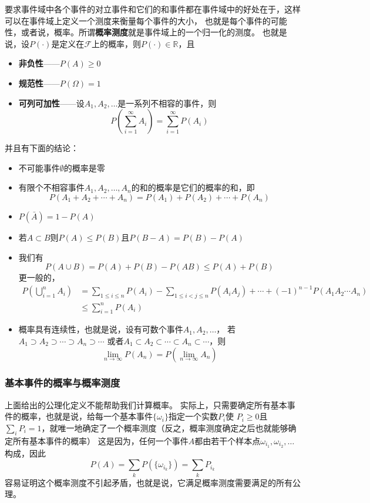 \documentclass[UTF8, a4paper]{ctexart}
\newcommand*{\reals}{\mathbb{R}}
\begin{document}
要求事件域中各个事件的对立事件和它们的和事件都在事件域中的好处在于，这样可以在事件域上定义一个测度来衡量每个事件的大小，
也就是每个事件的可能性，或者说，概率。所谓\textbf{概率测度}就是事件域上的一个归一化的测度。
也就是说，设$P(\cdot)$是定义在$\mathcal{F}$上的概率，则$P(\cdot) \in \reals$，且
\begin{itemize}
    \item \textbf{非负性}——$P(A) \geq 0$
    \item \textbf{规范性}——$P(\Omega)=1$
    \item \textbf{可列可加性}——设$A_1, A_2, \ldots$是一系列不相容的事件，则
    \[
        P\left(\sum_{i=1}^\infty A_i \right) = \sum_{i=1}^\infty P(A_i)
    \]
\end{itemize}
并且有下面的结论：
\begin{itemize}
    \item 不可能事件$\emptyset$的概率是零
    \item 有限个不相容事件$A_1, A_2, \ldots, A_n$的和的概率是它们的概率的和，即
    \[
        P(A_1+A_2+\cdots+A_n) = P(A_1) + P(A_2) + \cdots + P(A_n)
    \]
    \item $P(\bar{A}) = 1 - P(A)$
    \item 若$A \subset B$则$P(A) \leq P(B)$且$P(B-A)=P(B)-P(A)$
    \item 我们有
    \[
    P(A \cup B) = P(A) + P(B) - P(AB) \leq P(A) + P(B)
    \]
    更一般的，
    \[
        \begin{aligned}
            P\left( \bigcup_{i=1}^n A_i \right) &= \sum_{1 \leq i \leq n} P(A_i)
            - \sum_{1 \leq i < j \leq n} P(A_i A_j) + \cdots + (-1)^{n-1} P(A_1 A_2 \cdots A_n) \\
            & \leq \sum_{i=1}^n P(A_i)
        \end{aligned}
    \]
    \item 概率具有连续性，也就是说，设有可数个事件$A_1, A_2, \ldots$，
    若$A_1 \supset A_2 \supset \cdots \supset A_n \supset \cdots$
    或者$A_1 \subset A_2 \subset \cdots \subset A_n \subset \cdots$，则
    \[
        \lim_{n \to \infty} P(A_n) = P(\lim_{n \to \infty} A_n)
    \]
\end{itemize}

\subsubsection{基本事件的概率与概率测度}

上面给出的公理化定义不能帮助我们计算概率。
实际上，只需要确定所有基本事件的概率，也就是说，给每一个基本事件$\{\omega_i\}$指定一个实数$P_i$使
$P_i \geq 0$且$\sum_i P_i = 1$，就唯一地确定了一个概率测度（反之，概率测度确定之后也就能够确定所有基本事件的概率）
这是因为，任何一个事件$A$都由若干个样本点$\omega_{i_1}, \omega_{i_2}, \ldots$构成，因此
\[
    P(A) = \sum_{k} P(\{\omega_{i_k}\}) = \sum_{k} P_{i_k} 
\]
容易证明这个概率测度不引起矛盾，也就是说，它满足概率测度需要满足的所有公理。
\end{document}

